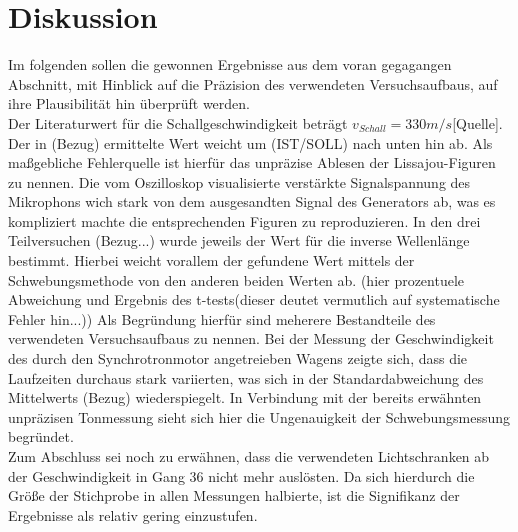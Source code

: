 \section{Diskussion}

Im folgenden sollen die gewonnen Ergebnisse aus dem voran gegagangen Abschnitt, mit Hinblick auf die Präzision
des verwendeten Versuchsaufbaus, auf ihre Plausibilität hin überprüft werden.  \\
Der Literaturwert für die Schallgeschwindigkeit beträgt $v_{Schall} = 330 m/s$[Quelle]. Der in (Bezug) ermittelte Wert weicht
um (IST/SOLL) nach unten hin ab. Als maßgebliche Fehlerquelle ist hierfür das unpräzise Ablesen der Lissajou-Figuren zu nennen. Die
vom Oszilloskop visualisierte verstärkte Signalspannung des Mikrophons wich stark von dem ausgesandten Signal des Generators ab, was es kompliziert
machte die entsprechenden Figuren zu reproduzieren.
In den drei Teilversuchen (Bezug...) wurde jeweils der Wert für die inverse Wellenlänge bestimmt. Hierbei weicht vorallem der gefundene
Wert mittels der Schwebungsmethode von den anderen beiden Werten ab. (hier prozentuele Abweichung
und Ergebnis des t-tests(dieser deutet vermutlich auf systematische Fehler hin...)) Als Begründung hierfür
sind meherere Bestandteile des verwendeten Versuchsaufbaus zu nennen.
Bei der Messung der Geschwindigkeit des durch den Synchrotronmotor angetreieben Wagens zeigte sich, dass die Laufzeiten
durchaus stark variierten, was sich in der Standardabweichung des Mittelwerts (Bezug) wiederspiegelt. In Verbindung mit der bereits erwähnten
unpräzisen Tonmessung sieht sich hier die Ungenauigkeit der Schwebungsmessung begründet. \\
Zum Abschluss sei noch zu erwähnen, dass die verwendeten Lichtschranken ab der Geschwindigkeit in Gang 36 nicht mehr auslösten. Da sich hierdurch
die Größe der Stichprobe in allen Messungen halbierte, ist die Signifikanz der Ergebnisse als relativ gering einzustufen.
